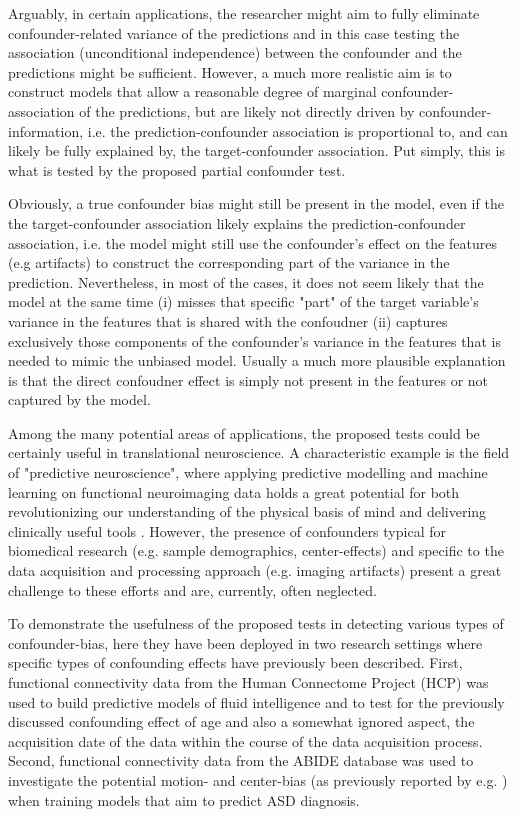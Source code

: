 \documentclass{article}
\begin{document}
Arguably, in certain applications, the researcher might aim to fully eliminate confounder-related variance of the predictions and in this case testing the association (unconditional independence) between the confounder and the predictions might be sufficient. However, a much more realistic aim is to construct models that allow a reasonable degree of marginal confounder-association of the predictions, but are likely not directly driven by confounder-information, i.e. the prediction-confounder association is proportional to, and can likely be fully explained by, the target-confounder association.
Put simply, this is what is tested by the proposed partial confounder test.

Obviously, a true confounder bias might still be present in the model, even if the the target-confounder association likely explains the prediction-confounder association, i.e. the model might still use the confounder's effect on the features (e.g artifacts) to construct the corresponding part of the variance in the prediction. Nevertheless, in most of the cases, it does not seem likely that the model at the same time (i) misses that specific "part" of the target variable's variance in the features that is shared with the confoudner (ii) captures exclusively those components of the confounder's variance in the features that is needed to mimic the unbiased model.
Usually a much more plausible explanation is that the direct confoudner effect is simply not present in the features or not captured by the model.

Among the many potential areas of applications, the proposed tests could be certainly useful in translational neuroscience. A characteristic example is the field of "predictive neuroscience", where applying predictive modelling and machine learning on functional neuroimaging data holds a great potential for both revolutionizing our understanding of the physical basis of mind and delivering clinically useful tools \citep{woo2017building, wager2013fmri, spisak2020pain}. However, the presence of confounders typical for biomedical research (e.g. sample demographics, center-effects) and specific to the data acquisition and processing approach (e.g. imaging artifacts) present a great challenge to these efforts and are, currently, often neglected.

To demonstrate the usefulness of the proposed tests in detecting various types of confounder-bias, here they have been deployed in two research settings where specific types of confounding effects have previously been described. 
First, functional connectivity data from the Human Connectome Project (HCP) \citep{van2013wu} was used to build predictive models of fluid intelligence and to test for the previously discussed confounding effect of age \cite{lohmann2021predicting, dubois2018distributed} and also a somewhat ignored aspect, the acquisition date of the data within the course of the data acquisition process.
Second, functional connectivity data from the ABIDE \citep{di2014autism} database was used to investigate the potential motion- and center-bias (as previously reported by e.g. \cite{spisak2014voxel, spisak2019optimal, gotts2013perils}) when training models that aim to predict ASD diagnosis.
\end{document}
